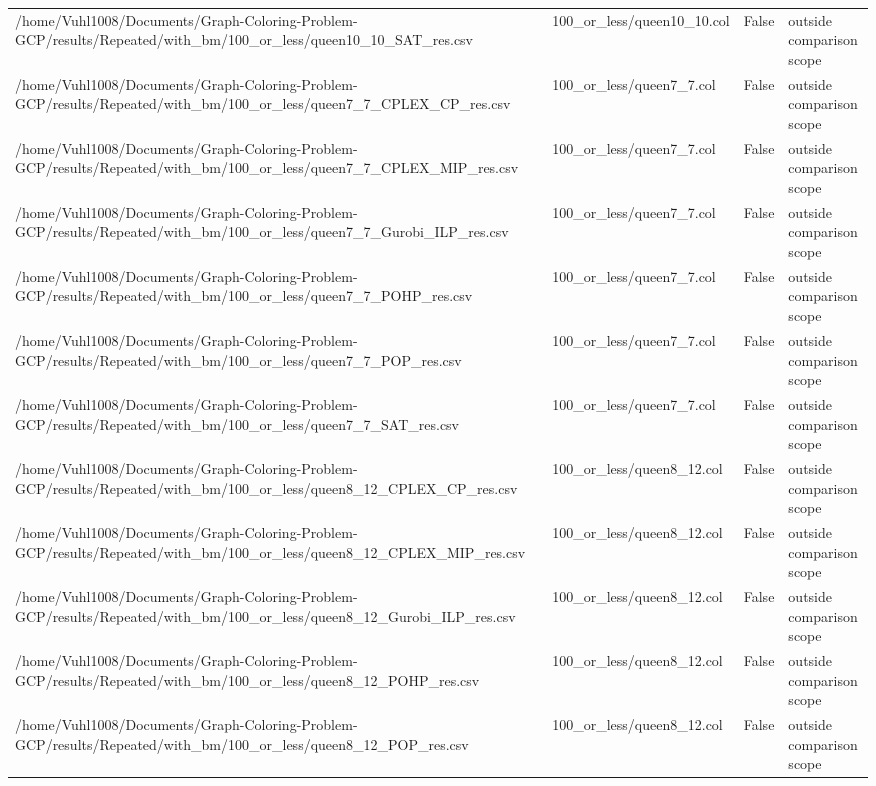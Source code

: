 \begin{table}[htbp]
\begin{tabular}{llll}
/home/Vuhl1008/Documents/Graph-Coloring-Problem-GCP/results/Repeated/with\_bm/100\_or\_less/queen10\_10\_SAT\_res.csv & 100\_or\_less/queen10\_10.col & False & outside comparison scope \\
/home/Vuhl1008/Documents/Graph-Coloring-Problem-GCP/results/Repeated/with\_bm/100\_or\_less/queen7\_7\_CPLEX\_CP\_res.csv & 100\_or\_less/queen7\_7.col & False & outside comparison scope \\
/home/Vuhl1008/Documents/Graph-Coloring-Problem-GCP/results/Repeated/with\_bm/100\_or\_less/queen7\_7\_CPLEX\_MIP\_res.csv & 100\_or\_less/queen7\_7.col & False & outside comparison scope \\
/home/Vuhl1008/Documents/Graph-Coloring-Problem-GCP/results/Repeated/with\_bm/100\_or\_less/queen7\_7\_Gurobi\_ILP\_res.csv & 100\_or\_less/queen7\_7.col & False & outside comparison scope \\
/home/Vuhl1008/Documents/Graph-Coloring-Problem-GCP/results/Repeated/with\_bm/100\_or\_less/queen7\_7\_POHP\_res.csv & 100\_or\_less/queen7\_7.col & False & outside comparison scope \\
/home/Vuhl1008/Documents/Graph-Coloring-Problem-GCP/results/Repeated/with\_bm/100\_or\_less/queen7\_7\_POP\_res.csv & 100\_or\_less/queen7\_7.col & False & outside comparison scope \\
/home/Vuhl1008/Documents/Graph-Coloring-Problem-GCP/results/Repeated/with\_bm/100\_or\_less/queen7\_7\_SAT\_res.csv & 100\_or\_less/queen7\_7.col & False & outside comparison scope \\
/home/Vuhl1008/Documents/Graph-Coloring-Problem-GCP/results/Repeated/with\_bm/100\_or\_less/queen8\_12\_CPLEX\_CP\_res.csv & 100\_or\_less/queen8\_12.col & False & outside comparison scope \\
/home/Vuhl1008/Documents/Graph-Coloring-Problem-GCP/results/Repeated/with\_bm/100\_or\_less/queen8\_12\_CPLEX\_MIP\_res.csv & 100\_or\_less/queen8\_12.col & False & outside comparison scope \\
/home/Vuhl1008/Documents/Graph-Coloring-Problem-GCP/results/Repeated/with\_bm/100\_or\_less/queen8\_12\_Gurobi\_ILP\_res.csv & 100\_or\_less/queen8\_12.col & False & outside comparison scope \\
/home/Vuhl1008/Documents/Graph-Coloring-Problem-GCP/results/Repeated/with\_bm/100\_or\_less/queen8\_12\_POHP\_res.csv & 100\_or\_less/queen8\_12.col & False & outside comparison scope \\
/home/Vuhl1008/Documents/Graph-Coloring-Problem-GCP/results/Repeated/with\_bm/100\_or\_less/queen8\_12\_POP\_res.csv & 100\_or\_less/queen8\_12.col & False & outside comparison scope \\

\end{tabular}
\end{table}
